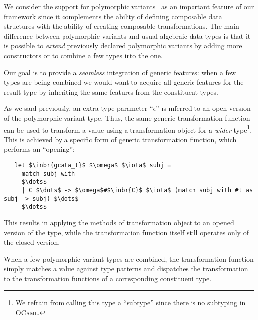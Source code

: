 We consider the support for polymorphic variants~\cite{PolyVar,PolyVarReuse} as an important feature of our framework since it complements the ability of defining
composable data structures with the ability of creating composable transformations. The main difference between polymorphic variants and usual algebraic
data types is that it is possible to \emph{extend} previously declared polymorphic variants by adding more constructors or to combine a few types into the one. 

Our goal is to provide a \emph{seamless} integration of generic features: when a few types are being combined we would want to acquire all generic
features for the result type by inheriting the same features from the constituent types.

As we said previously, an extra type parameter ``$\epsilon$'' is inferred to an open version of the polymorphic variant type. Thus, the same generic transformation
function can be used to transform a value using a transformation object for a \emph{wider} type\footnote{We refrain from calling this type a ``subtype'' since there is
no subtyping in \textsc{OCaml}.}. This is achieved by a specific form of generic transformation function, which performs an ``opening'':

\begin{lstlisting}
   let $\inbr{gcata_t}$ $\omega$ $\iota$ subj =
     match subj with
     $\dots$
     | C $\dots$ -> $\omega$#$\inbr{C}$ $\iota$ (match subj with #t as subj -> subj) $\dots$
     $\dots$
\end{lstlisting}

This results in applying the methods of transformation object to an opened version of the type, while the transformation function itself still operates only
of the closed version.

When a few polymorphic variant types are combined, the transformation function simply matches a value against type patterns and dispatches the
transformation to the transformation functions of a corresponding constituent type.
